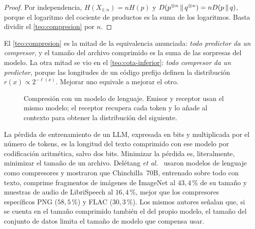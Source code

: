 \begin{proof}
Por independencia, $H(X_{1:n})=nH(p)$ y $D(p^{\otimes n}\,\|\,q^{\otimes n})=nD(p\,\|\,q)$, porque el logaritmo del cociente de productos es la suma de los logaritmos. Basta dividir el \cref{teo:compresion} por $n$.
\end{proof}

El \cref{teo:compresion} es la mitad de la equivalencia anunciada: \emph{todo predictor da un compresor}, y el tamaño del archivo comprimido es la suma de las sorpresas del modelo. La otra mitad se vio en el \cref{teo:cota-inferior}: \emph{todo compresor da un predictor}, porque las longitudes de un código prefijo definen la distribución $r(x)\propto2^{-\ell(x)}$. Mejorar uno equivale a mejorar el otro.

\begin{figure}[h]
\centering
{}
\caption{Compresión con un modelo de lenguaje. Emisor y receptor usan el mismo modelo; el receptor recupera cada token y lo añade al contexto para obtener la distribución del siguiente.}
\label{fig:compresor}
\end{figure}

\begin{observacion}
La pérdida de entrenamiento de un LLM, expresada en bits y multiplicada por el número de tokens, es la longitud del texto comprimido con ese modelo por codificación aritmética, salvo dos bits. Minimizar la pérdida es, literalmente, minimizar el tamaño de un archivo. Delétang \emph{et al.}~\cite{deletang} usaron modelos de lenguaje como compresores y mostraron que Chinchilla~70B, entrenado sobre todo con texto, comprime fragmentos de imágenes de ImageNet al $43{,}4\,\%$ de su tamaño y muestras de audio de LibriSpeech al $16{,}4\,\%$, mejor que los compresores específicos PNG ($58{,}5\,\%$) y FLAC ($30{,}3\,\%$). Los mismos autores señalan que, si se cuenta en el tamaño comprimido también el del propio modelo, el tamaño del conjunto de datos limita el tamaño de modelo que compensa usar.
\end{observacion}

